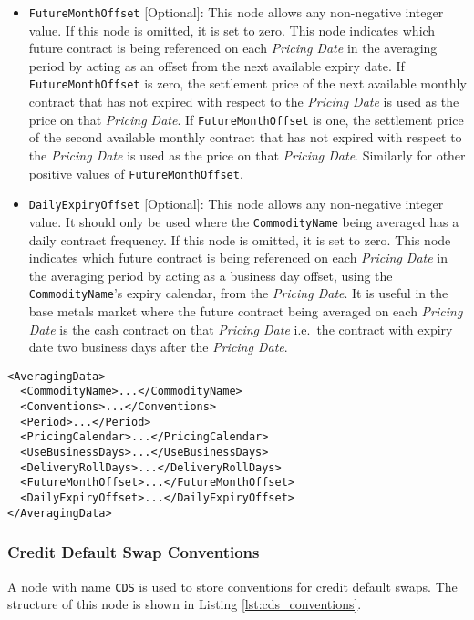 \begin{itemize}
\item \lstinline!FutureMonthOffset! [Optional]: This node allows any non-negative integer value. If this node is omitted, it is set to zero. This node indicates which future contract is being referenced on each \textit{Pricing Date} in the averaging period by acting as an offset from the next available expiry date. If \lstinline!FutureMonthOffset! is zero, the settlement price of the next available monthly contract that has not expired with respect to the \textit{Pricing Date} is used as the price on that \textit{Pricing Date}. If \lstinline!FutureMonthOffset! is one, the settlement price of the second available monthly contract that has not expired with respect to the \textit{Pricing Date} is used as the price on that \textit{Pricing Date}. Similarly for other positive values of \lstinline!FutureMonthOffset!.
\item \lstinline!DailyExpiryOffset! [Optional]: This node allows any non-negative integer value. It should only be used where the \lstinline!CommodityName! being averaged has a daily contract frequency. If this node is omitted, it is set to zero. This node indicates which future contract is being referenced on each \textit{Pricing Date} in the averaging period by acting as a business day offset, using the \lstinline!CommodityName!'s expiry calendar, from the \textit{Pricing Date}. It is useful in the base metals market where the future contract being averaged on each \textit{Pricing Date} is the cash contract on that \textit{Pricing Date} i.e.\ the contract with expiry date two business days after the \textit{Pricing Date}.
\end{itemize}

\begin{listing}[h!]
\begin{verbatim}
<AveragingData>
  <CommodityName>...</CommodityName>
  <Conventions>...</Conventions>
  <Period>...</Period>
  <PricingCalendar>...</PricingCalendar>
  <UseBusinessDays>...</UseBusinessDays>
  <DeliveryRollDays>...</DeliveryRollDays>
  <FutureMonthOffset>...</FutureMonthOffset>
  <DailyExpiryOffset>...</DailyExpiryOffset>
</AveragingData>
\end{verbatim}
\caption{\lstinline!AveragingData! node structure}
\label{lst:ave_data_comm_future_convention}
\end{listing}

\subsubsection{Credit Default Swap Conventions}
\label{sss:cds_conventions}
A node with name \lstinline!CDS! is used to store conventions for credit default swaps. The structure of this node is shown in Listing \ref{lst:cds_conventions}.

